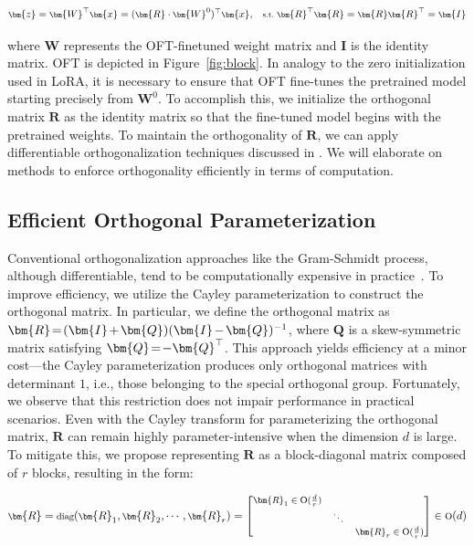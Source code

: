 \begin{equation}\label{eq:oft_general}
    \footnotesize
    \bm{z}=\bm{W}^\top\bm{x}=(\bm{R}\cdot\bm{W}^0)^\top\bm{x},~~~\text{s.t.}~\bm{R}^\top\bm{R}=\bm{R}\bm{R}^\top=\bm{I}
\end{equation}

where $\bm{W}$ represents the OFT-finetuned weight matrix and $\bm{I}$ is the identity matrix. OFT is depicted in Figure~\ref{fig:block}. In analogy to the zero initialization used in LoRA, it is necessary to ensure that OFT fine-tunes the pretrained model starting precisely from $\bm{W}^0$. To accomplish this, we initialize the orthogonal matrix $\bm{R}$ as the identity matrix so that the fine-tuned model begins with the pretrained weights. To maintain the orthogonality of $\bm{R}$, we can apply differentiable orthogonalization techniques discussed in \cite{liu2021orthogonal,lezcano2019cheap}. We will elaborate on methods to enforce orthogonality efficiently in terms of computation.

\subsection{Efficient Orthogonal Parameterization}\label{sect:eff_ortho}

Conventional orthogonalization approaches like the Gram-Schmidt process, although differentiable, tend to be computationally expensive in practice~\cite{liu2021orthogonal}. To improve efficiency, we utilize the Cayley parameterization to construct the orthogonal matrix. In particular, we define the orthogonal matrix as $\thickmuskip=2mu \medmuskip=2mu \bm{R}=(\bm{I}+\bm{Q})(\bm{I}-\bm{Q})^{-1}$, where $\bm{Q}$ is a skew-symmetric matrix satisfying $\thickmuskip=2mu \medmuskip=2mu \bm{Q}=-\bm{Q}^\top$. This approach yields efficiency at a minor cost—the Cayley parameterization produces only orthogonal matrices with determinant $1$, i.e., those belonging to the special orthogonal group. Fortunately, we observe that this restriction does not impair performance in practical scenarios. Even with the Cayley transform for parameterizing the orthogonal matrix, $\bm{R}$ can remain highly parameter-intensive when the dimension $d$ is large. To mitigate this, we propose representing $\bm{R}$ as a block-diagonal matrix composed of $r$ blocks, resulting in the form:

\begin{equation}
    \footnotesize
    \bm{R}=\text{diag}(\bm{R}_1,\bm{R}_2,\cdots,\bm{R}_r)=\begin{bmatrix}
    \bm{R}_1\in \text{O}(\frac{d}{r}) &  &\\
    &\ddots & \\
    & & \bm{R}_r\in \text{O}(\frac{d}{r})
    \end{bmatrix}\in \text{O}(d)
\end{equation}


